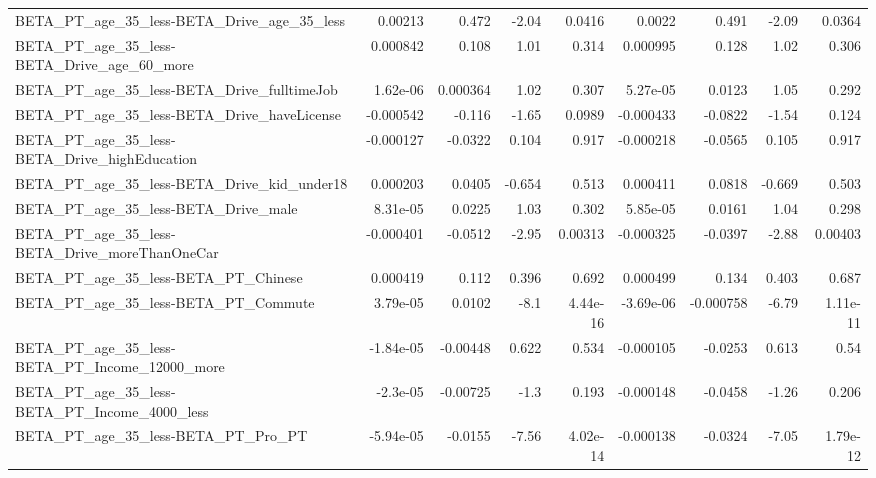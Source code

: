 \begin{tabular}{lrrrrrrrr}
BETA\_PT\_age\_35\_less-BETA\_Drive\_age\_35\_less         &     0.00213 &        0.472 &     -2.04 &   0.0416 &     0.0022 &       0.491 &        -2.09 &        0.0364 \\
BETA\_PT\_age\_35\_less-BETA\_Drive\_age\_60\_more         &    0.000842 &        0.108 &      1.01 &    0.314 &   0.000995 &       0.128 &         1.02 &         0.306 \\
BETA\_PT\_age\_35\_less-BETA\_Drive\_fulltimeJob         &    1.62e-06 &     0.000364 &      1.02 &    0.307 &   5.27e-05 &      0.0123 &         1.05 &         0.292 \\
BETA\_PT\_age\_35\_less-BETA\_Drive\_haveLicense         &   -0.000542 &       -0.116 &     -1.65 &   0.0989 &  -0.000433 &     -0.0822 &        -1.54 &         0.124 \\
BETA\_PT\_age\_35\_less-BETA\_Drive\_highEducation       &   -0.000127 &      -0.0322 &     0.104 &    0.917 &  -0.000218 &     -0.0565 &        0.105 &         0.917 \\
BETA\_PT\_age\_35\_less-BETA\_Drive\_kid\_under18         &    0.000203 &       0.0405 &    -0.654 &    0.513 &   0.000411 &      0.0818 &       -0.669 &         0.503 \\
BETA\_PT\_age\_35\_less-BETA\_Drive\_male                &    8.31e-05 &       0.0225 &      1.03 &    0.302 &   5.85e-05 &      0.0161 &         1.04 &         0.298 \\
BETA\_PT\_age\_35\_less-BETA\_Drive\_moreThanOneCar      &   -0.000401 &      -0.0512 &     -2.95 &  0.00313 &  -0.000325 &     -0.0397 &        -2.88 &       0.00403 \\
BETA\_PT\_age\_35\_less-BETA\_PT\_Chinese                &    0.000419 &        0.112 &     0.396 &    0.692 &   0.000499 &       0.134 &        0.403 &         0.687 \\
BETA\_PT\_age\_35\_less-BETA\_PT\_Commute                &    3.79e-05 &       0.0102 &      -8.1 & 4.44e-16 &  -3.69e-06 &   -0.000758 &        -6.79 &      1.11e-11 \\
BETA\_PT\_age\_35\_less-BETA\_PT\_Income\_12000\_more      &   -1.84e-05 &     -0.00448 &     0.622 &    0.534 &  -0.000105 &     -0.0253 &        0.613 &          0.54 \\
BETA\_PT\_age\_35\_less-BETA\_PT\_Income\_4000\_less       &    -2.3e-05 &     -0.00725 &      -1.3 &    0.193 &  -0.000148 &     -0.0458 &        -1.26 &         0.206 \\
BETA\_PT\_age\_35\_less-BETA\_PT\_Pro\_PT                 &   -5.94e-05 &      -0.0155 &     -7.56 & 4.02e-14 &  -0.000138 &     -0.0324 &        -7.05 &      1.79e-12 \\

\end{tabular}
